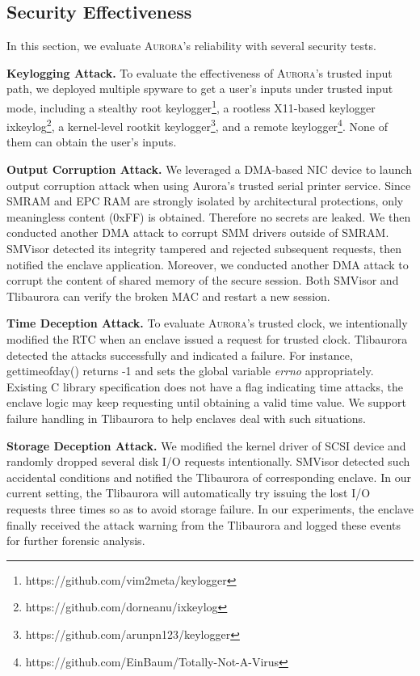 \subsection{Security Effectiveness}\label{security}
In this section, we evaluate \textsc{Aurora}'s reliability with several security tests.

\textbf{Keylogging Attack.}
To evaluate the effectiveness of \textsc{Aurora}'s trusted input path, we deployed multiple spyware to get a user's inputs under trusted input mode, including a stealthy root keylogger\footnote{https://github.com/vim2meta/keylogger}, a rootless X11-based keylogger ixkeylog\footnote{https://github.com/dorneanu/ixkeylog}, a kernel-level rootkit keylogger\footnote{https://github.com/arunpn123/keylogger}, and a remote keylogger\footnote{https://github.com/EinBaum/Totally-Not-A-Virus}. None of them can obtain the user's inputs.

\textbf{Output Corruption Attack.}
We leveraged a DMA-based NIC device to launch output corruption attack when using Aurora's trusted serial printer service. Since  SMRAM and EPC RAM are strongly isolated by architectural protections, only meaningless content (0xFF) is obtained. Therefore no secrets are leaked. We then conducted another DMA attack to corrupt SMM drivers outside of SMRAM. SMVisor detected its integrity tampered  and rejected subsequent requests, then notified the enclave application. Moreover, we conducted another DMA attack to corrupt the content of shared memory of the secure session. Both SMVisor and Tlibaurora can verify the broken MAC and restart a new session.

\textbf{Time Deception Attack.}
To evaluate \textsc{Aurora}’s trusted clock, we intentionally modified the RTC when an enclave issued a request for trusted clock. Tlibaurora detected the attacks successfully and indicated a failure. For instance, \textsf{gettimeofday()} returns -1 and sets the global variable \textit{errno} appropriately. Existing C library specification does not have a flag indicating time attacks, the enclave logic may keep requesting until obtaining a valid time value. We support failure handling in Tlibaurora to help enclaves deal with such situations.

\textbf{Storage Deception Attack.}
We modified the kernel driver of SCSI device and randomly dropped several disk I/O requests intentionally.  SMVisor detected such accidental conditions and notified the Tlibaurora of corresponding enclave. In our current setting, the Tlibaurora will automatically try issuing the lost I/O requests three times so as to avoid storage failure. In our experiments, the enclave finally received the attack warning from the Tlibaurora and logged these events for further forensic analysis.


